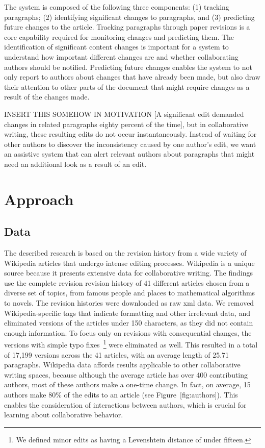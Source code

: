 The system is composed of the following three components: (1) tracking
paragraphs; (2) identifying significant changes to paragraphs, and (3)
predicting future changes to the article. Tracking paragraphs through
paper revisions is a core capability required for monitoring changes and
predicting them. The identification of significant content changes is
important for a system to understand how important different changes are
and whether collaborating authors should be notified. Predicting future
changes enables the system to not only report to authors about changes
that have already been made, but also draw their attention to other
parts of the document that might require changes as a result of the
changes made.

INSERT THIS SOMEHOW IN MOTIVATION {[}A significant edit demanded changes
in related paragraphs eighty percent of the time{]}, but in
collaborative writing, these resulting edits do not occur
instantaneously. Instead of waiting for other authors to discover the
inconsistency caused by one author's edit, we want an assistive system
that can alert relevant authors about paragraphs that might need an
additional look as a result of an edit.

\section{Approach}\label{approach}

\subsection{Data}\label{data}

The described research is based on the revision history from a wide
variety of Wikipedia articles that undergo intense editing processes.
Wikipedia is a unique source because it presents extensive data for
collaborative writing. The findings use the complete revision revision
history of 41 different articles chosen from a diverse set of topics,
from famous people and places to mathematical algorithms to novels. The
revision histories were downloaded as raw xml data. We removed
Wikipedia-specific tags that indicate formatting and other irrelevant
data, and eliminated versions of the articles under 150 characters, as
they did not contain enough information. To focus only on revisions with
consequential changes, the versions with simple typo fixes~\footnote{We
  defined minor edits as having a Levenshtein distance of under fifteen.}
were eliminated as well. This resulted in a total of 17,199 versions
across the 41 articles, with an average length of 25.71 paragraphs.
Wikipedia data affords results applicable to other collaborative writing
spaces, because although the average article has over 400 contributing
authors, most of these authors make a one-time change. In fact, on
average, 15 authors make 80\% of the edits to an article (see
Figure~{[}fig:authors{]}). This enables the consideration of
interactions between authors, which is crucial for learning about
collaborative behavior.

